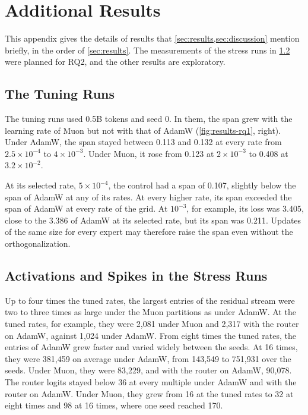 \chapter{Additional Results}
\label{app:results}

This appendix gives the details of results that \cref{sec:results,sec:discussion} mention briefly, in the order of \cref{sec:results}. The measurements of the stress runs in \cref{app:results-stress} were planned for RQ2, and the other results are exploratory.

\section{The Tuning Runs}
\label{app:results-tuning}
The tuning runs used 0.5B tokens and seed 0. In them, the span grew with the learning rate of Muon but not with that of AdamW (\cref{fig:results-rq1}, right). Under AdamW, the span stayed between 0.113 and 0.132 at every rate from $2.5 \times 10^{-4}$ to $4 \times 10^{-3}$. Under Muon, it rose from 0.123 at $2 \times 10^{-3}$ to 0.408 at $3.2 \times 10^{-2}$.

At its selected rate, $5 \times 10^{-4}$, the control had a span of 0.107, slightly below the span of AdamW at any of its rates. At every higher rate, its span exceeded the span of AdamW at every rate of the grid. At $10^{-3}$, for example, its loss was 3.405, close to the 3.386 of AdamW at its selected rate, but its span was 0.211. Updates of the same size for every expert may therefore raise the span even without the orthogonalization.

\section{Activations and Spikes in the Stress Runs}
\label{app:results-stress}
Up to four times the tuned rates, the largest entries of the residual stream were two to three times as large under the Muon partitions as under AdamW\@. At the tuned rates, for example, they were 2,081 under Muon and 2,317 with the router on AdamW, against 1,024 under AdamW\@. From eight times the tuned rates, the entries of AdamW grew faster and varied widely between the seeds. At 16 times, they were 381,459 on average under AdamW, from 143,549 to 751,931 over the seeds. Under Muon, they were 83,229, and with the router on AdamW, 90,078. The router logits stayed below 36 at every multiple under AdamW and with the router on AdamW\@. Under Muon, they grew from 16 at the tuned rates to 32 at eight times and 98 at 16 times, where one seed reached 170.

